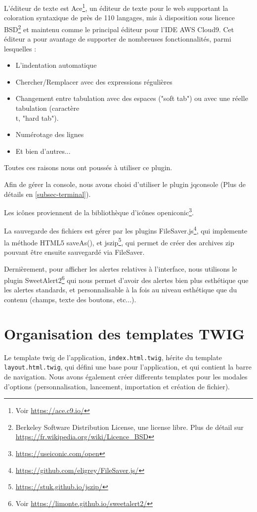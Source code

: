 L'éditeur de texte est Ace\footnote{Voir \url{https://ace.c9.io/}}, un éditeur de texte pour le web supportant la coloration syntaxique de près de 110 langages, mis à disposition sous licence BSD\footnote{Berkeley Software Distribution License, une license libre. Plus de détail sur \url{https://fr.wikipedia.org/wiki/Licence_BSD}} et maintenu comme le principal éditeur pour l'IDE AWS Cloud9. Cet éditeur a pour avantage de supporter de nombreuses fonctionnalités, parmi lesquelles :

\begin{itemize}
  \item L'indentation automatique
  \item Chercher/Remplacer avec des expressions régulières
  \item Changement entre tabulation avec des espaces ("soft tab") ou avec une réelle tabulation (caractère \\t, "hard tab").
  \item Numérotage des lignes
  \item Et bien d'autres...
\end{itemize}

Toutes ces raisons nous ont poussés à utiliser ce plugin.

Afin de gérer la console, nous avons choisi d'utiliser le plugin jqconsole (Plus de détails en \ref{subsec-terminal}).

Les icônes proviennent de la bibliothèque d'icônes openiconic\footnote{\url{https://useiconic.com/open}}.

La sauvegarde des fichiers est gérer par les plugins FileSaver.js\footnote{\url{https://github.com/eligrey/FileSaver.js/}}, qui implemente la méthode HTML5 saveAs(), et jszip\footnote{\url{https://stuk.github.io/jszip/}}, qui permet de créer des archives zip pouvant être ensuite sauvegardé via FileSaver.

Dernièrement, pour afficher les alertes relatives à l'interface, nous utilisons le plugin SweetAlert2\footnote{Voir \url{https://limonte.github.io/sweetalert2/}} qui nous permet d'avoir des alertes bien plus esthétique que les alertes standards, et personnalisable à la fois au niveau esthétique que du contenu (champs, texte des boutons, etc...).

\section{Organisation des templates TWIG}

Le template twig de l'application, \texttt{index.html.twig}, hérite du template \texttt{layout.html.twig}, qui défini une base pour l'application, et qui contient la barre de navigation. Nous avons également créer differents templates pour les modales d'options (personnalisation, lancement, importation et création de fichier).

